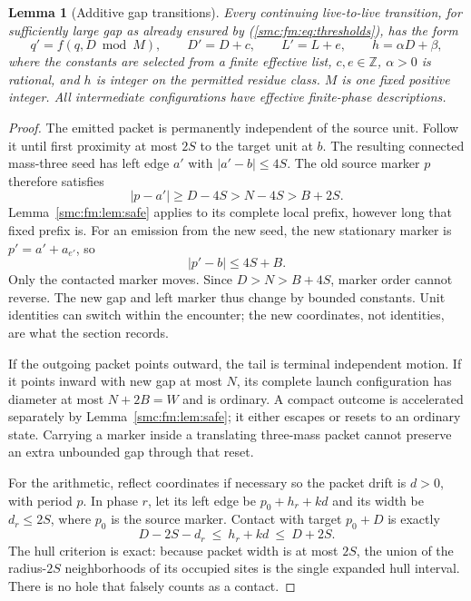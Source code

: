 \documentclass[11pt,letterpaper]{article}
\numberwithin{equation}{section}
\newtheorem{lemma}[theorem]{Lemma}
\theoremstyle{definition}
\theoremstyle{remark}
\newcommand{\Z}{\mathbb Z}
\begin{document}
\begin{lemma}[Additive gap transitions]\label{smc:fm:lem:counter}
Every continuing live-to-live transition, for sufficiently large gap as
already ensured by (\ref{smc:fm:eq:thresholds}), has the form
\begin{equation}
 q'=f(q,D\bmod M),\qquad
 D'=D+c,\qquad L'=L+e,\qquad h=\alpha D+\beta,       \label{smc:fm:eq:counter}
\end{equation}
where the constants are selected from a finite effective list,
$c,e\in\Z$, $\alpha>0$ is rational, and $h$ is integer on the permitted
residue class. $M$ is one fixed positive integer. All intermediate
configurations have effective finite-phase descriptions.
\end{lemma}
\begin{proof}
The emitted packet is permanently independent of the source unit. Follow it
until first proximity at most $2S$ to the target unit at $b$. The resulting
connected mass-three seed has left edge $a'$ with $|a'-b|\le4S$.
The old source marker $p$ therefore satisfies
\[
 |p-a'|\ge D-4S>N-4S>B+2S.
\]
Lemma~\ref{smc:fm:lem:safe} applies to its complete local prefix, however long that
fixed prefix is. For an emission from the new seed, the new stationary marker
is $p'=a'+a_{e'}$, so
\[
 |p'-b|\le4S+B.
\]
Only the contacted marker moves. Since $D>N>B+4S$, marker order cannot
reverse. The new gap and left marker thus change by bounded constants. Unit
identities can switch within the encounter; the new coordinates, not identities,
are what the section records.

If the outgoing packet points outward, the tail is terminal independent
motion. If it points inward with new gap at most $N$, its complete launch
configuration has diameter at most $N+2B=W$ and is ordinary. A compact
outcome is accelerated separately by Lemma~\ref{smc:fm:lem:safe}; it either escapes
or resets to an ordinary state. Carrying a marker inside a translating
three-mass packet cannot preserve an extra unbounded gap through that reset.

For the arithmetic, reflect coordinates if necessary so the packet drift is
$d>0$, with period $p$. In phase $r$, let its left edge be
$p_0+h_r+kd$ and its width be $d_r\le2S$, where $p_0$ is the source marker.
Contact with target $p_0+D$ is exactly
\begin{equation}
 D-2S-d_r\ \le\ h_r+kd\ \le\ D+2S.             \label{smc:fm:eq:contact}
\end{equation}
The hull criterion is exact: because packet width is at most $2S$, the union
of the radius-$2S$ neighborhoods of its occupied sites is the single expanded
hull interval. There is no hole that falsely counts as a contact.


\end{proof}
\end{document}

